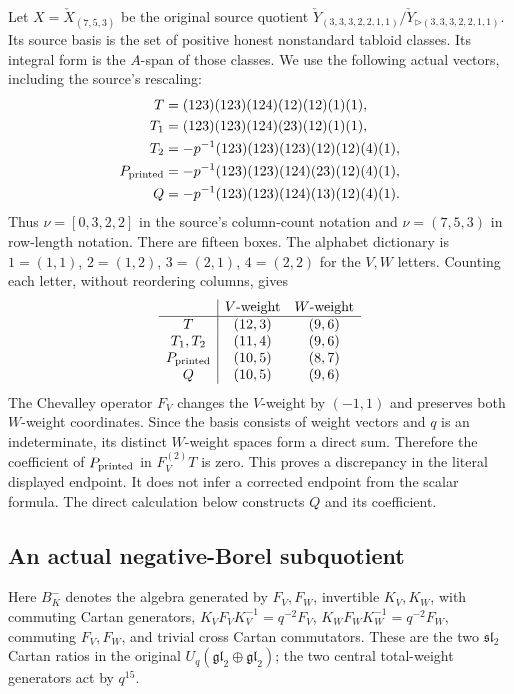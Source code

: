 Let $X=\check X_{(7,5,3)}$ be the original source quotient
$\check Y_{(3,3,3,2,2,1,1)}/\check Y_{\triangleright(3,3,3,2,2,1,1)}$.
Its source basis is the set of positive honest nonstandard tabloid
classes. Its integral form is the $A$-span of those classes. We use
the following actual vectors, including the source's rescaling:
\begin{align*}
 T&=(123)(123)(124)(12)(12)(1)(1),\\
 T_1&=(123)(123)(124)(23)(12)(1)(1),\\
 T_2&=-p^{-1}(123)(123)(123)(12)(12)(4)(1),\\
 P_{\rm printed}&=-p^{-1}(123)(123)(124)(23)(12)(4)(1),\\
 Q&=-p^{-1}(123)(123)(124)(13)(12)(4)(1).
\end{align*}
Thus $\nu=[0,3,2,2]$ in the source's column-count notation and
$\nu=(7,5,3)$ in row-length notation. There are fifteen boxes.
The alphabet dictionary is
$1=(1,1)$, $2=(1,2)$, $3=(2,1)$, $4=(2,2)$ for the $V,W$ letters.
Counting each letter, without reordering columns, gives
\[
\begin{array}{c|cc}
 &V\text{-weight}&W\text{-weight}\\\hline
T&(12,3)&(9,6)\\
T_1,T_2&(11,4)&(9,6)\\
P_{\rm printed}&(10,5)&(8,7)\\
Q&(10,5)&(9,6)
\end{array}
\]
The Chevalley operator $F_V$ changes the $V$-weight by $(-1,1)$ and
preserves both $W$-weight coordinates. Since the basis consists of
weight vectors and $q$ is an indeterminate, its distinct $W$-weight
spaces form a direct sum. Therefore the coefficient of
$P_{\rm printed}$ in $F_V^{(2)}T$ is zero. This proves a discrepancy
in the literal displayed endpoint. It does not infer a corrected
endpoint from the scalar formula. The direct calculation below
constructs $Q$ and its coefficient.



\subsection{An actual negative-Borel subquotient}

Here $B^-_K$ denotes the algebra generated by $F_V,F_W$, invertible
$K_V,K_W$, with commuting Cartan generators,
$K_VF_VK_V^{-1}=q^{-2}F_V$,
$K_WF_WK_W^{-1}=q^{-2}F_W$, commuting $F_V,F_W$, and trivial cross
Cartan commutators. These are the two $\mathfrak{sl}_2$ Cartan
ratios in the original $U_q(\mathfrak{gl}_2\oplus\mathfrak{gl}_2)$;
the two central total-weight generators act by $q^{15}$.

